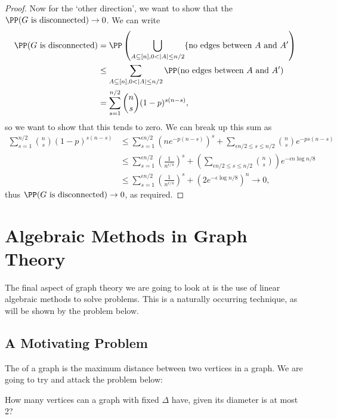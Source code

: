 \begin{proof}
	Now for the `other direction', we want to show that the $\PP(\text{$G$ is disconnected}) \rightarrow 0$. We can write
	\begin{align*}
		\PP(\text{$G$ is disconnected}) &= \PP\left(\bigcup_{A \subseteq [n], 0 <|A| \leq n/2} \{\text{no edges between $A$ and $A'$} \right) \\
		&\leq \sum_{A \subseteq [n], 0 <|A| \leq n/2} \PP(\text{no edges between $A$ and $A'$}) \\
		&= \sum_{s = 1}^{n/2} \binom{n}{s} (1 - p)^{s(n - s)},
	\end{align*}
	so we want to show that this tends to zero. We can break up this sum as
	\begin{align*}
		\sum_{s = 1}^{n/2} \binom{n}{s} (1 - p)^{s(n - s)} &\leq \sum_{s = 1}^{\epsilon n/2} \left(n e^{-p(n - s)}\right)^s+ \sum_{\epsilon n/2 \leq s \leq n/2} \binom{n}{s}e^{-ps(n - s)} \\
		&\leq \sum_{s = 1}^{\epsilon n/2} \left(\frac{1}{n^{\epsilon/4}}\right)^s+ \left(\sum_{\epsilon n/2 \leq s \leq n/2} \binom{n}{s} \right) e^{-\epsilon n \log n/8} \\
		&\leq \sum_{s = 1}^{\epsilon n/2} \left(\frac{1}{n^{\epsilon/4}}\right)^s+ \left(2 e^{-\epsilon \log n/8}\right)^n \longrightarrow 0,
	\end{align*}
	thus $\PP(\text{$G$ is disconnected}) \rightarrow 0$, as required.
\end{proof}

\section{Algebraic Methods in Graph Theory}

The final aspect of graph theory we are going to look at is the use of linear algebraic methods to solve problems. This is a naturally occurring technique, as will be shown by the problem below.

\subsection{A Motivating Problem}

The  of a graph is the maximum distance between two vertices in a graph. We are going to try and attack the problem below:
\begin{center}
	How many vertices can a graph with fixed $\Delta$ have, given its diameter is at most 2?
\end{center}


